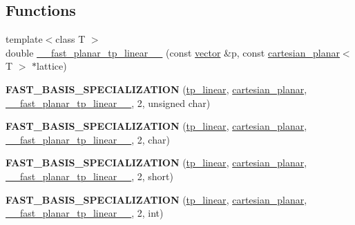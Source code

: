 \subsection*{Functions}
\begin{DoxyCompactItemize}
\item 
{\footnotesize template$<$class T $>$ }\\double \hyperlink{namespacesisl_a7295912c88c93a730de6a93f9bfff854}{\+\_\+\+\_\+fast\+\_\+planar\+\_\+tp\+\_\+linear\+\_\+\+\_\+} (const \hyperlink{namespacesisl_a2069bd5374a9be042ff3ce3306d41e1a}{vector} \&p, const \hyperlink{classsisl_1_1cartesian__planar}{cartesian\+\_\+planar}$<$ T $>$ $\ast$lattice)
\item 
\mbox{\label{namespacesisl_a88de527ba071c0203e68dde0caf2257a}} 
{\bfseries F\+A\+S\+T\+\_\+\+B\+A\+S\+I\+S\+\_\+\+S\+P\+E\+C\+I\+A\+L\+I\+Z\+A\+T\+I\+ON} (\hyperlink{classsisl_1_1tp__linear}{tp\+\_\+linear}, \hyperlink{classsisl_1_1cartesian__planar}{cartesian\+\_\+planar}, \hyperlink{namespacesisl_a7295912c88c93a730de6a93f9bfff854}{\+\_\+\+\_\+fast\+\_\+planar\+\_\+tp\+\_\+linear\+\_\+\+\_\+}, 2, unsigned char)
\item 
\mbox{\label{namespacesisl_a38991de77fa5cd8ecbd9e3bf6f6a1c59}} 
{\bfseries F\+A\+S\+T\+\_\+\+B\+A\+S\+I\+S\+\_\+\+S\+P\+E\+C\+I\+A\+L\+I\+Z\+A\+T\+I\+ON} (\hyperlink{classsisl_1_1tp__linear}{tp\+\_\+linear}, \hyperlink{classsisl_1_1cartesian__planar}{cartesian\+\_\+planar}, \hyperlink{namespacesisl_a7295912c88c93a730de6a93f9bfff854}{\+\_\+\+\_\+fast\+\_\+planar\+\_\+tp\+\_\+linear\+\_\+\+\_\+}, 2, char)
\item 
\mbox{\label{namespacesisl_ae7efd7a61d967125eb5a75b37371a1bc}} 
{\bfseries F\+A\+S\+T\+\_\+\+B\+A\+S\+I\+S\+\_\+\+S\+P\+E\+C\+I\+A\+L\+I\+Z\+A\+T\+I\+ON} (\hyperlink{classsisl_1_1tp__linear}{tp\+\_\+linear}, \hyperlink{classsisl_1_1cartesian__planar}{cartesian\+\_\+planar}, \hyperlink{namespacesisl_a7295912c88c93a730de6a93f9bfff854}{\+\_\+\+\_\+fast\+\_\+planar\+\_\+tp\+\_\+linear\+\_\+\+\_\+}, 2, short)
\item 
\mbox{\label{namespacesisl_a8d3efa8fdefe2c747c5f38181f71a469}} 
{\bfseries F\+A\+S\+T\+\_\+\+B\+A\+S\+I\+S\+\_\+\+S\+P\+E\+C\+I\+A\+L\+I\+Z\+A\+T\+I\+ON} (\hyperlink{classsisl_1_1tp__linear}{tp\+\_\+linear}, \hyperlink{classsisl_1_1cartesian__planar}{cartesian\+\_\+planar}, \hyperlink{namespacesisl_a7295912c88c93a730de6a93f9bfff854}{\+\_\+\+\_\+fast\+\_\+planar\+\_\+tp\+\_\+linear\+\_\+\+\_\+}, 2, int)

\end{DoxyCompactItemize}
